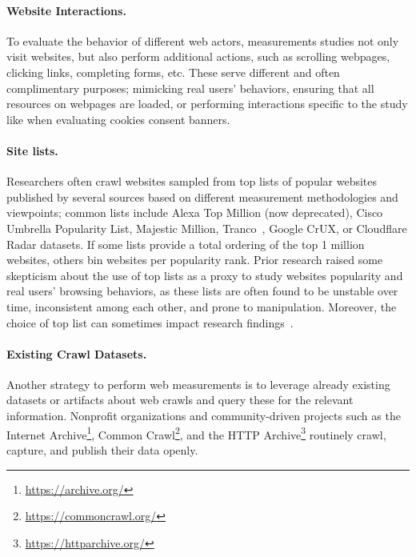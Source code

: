 \paragraph{Website Interactions.}
To evaluate the behavior of different web actors, measurements studies not only visit websites, but also perform additional actions, such as scrolling webpages, clicking links, completing forms, etc. These serve different and often complimentary purposes; mimicking real users' behaviors, ensuring that all resources on webpages are loaded, or performing interactions specific to the study like when evaluating cookies consent banners.

\paragraph{Site lists.}
Researchers often crawl websites sampled from top lists of popular websites published by several sources based on different measurement methodologies and viewpoints; common lists include Alexa Top Million (now deprecated), Cisco Umbrella Popularity List, Majestic Million, Tranco~\cite{lepochatTrancoResearchOrientedTop2019}, Google CrUX, or Cloudflare Radar datasets. If some lists provide a total ordering of the top 1 million websites, others bin websites per popularity rank. Prior research raised some skepticism about the use of top lists as a proxy to study websites popularity and real users' browsing behaviors, as these lists are often found to be unstable over time, inconsistent among each other, and prone to manipulation. Moreover, the choice of top list can sometimes impact research findings~\cite{lepochatTrancoResearchOrientedTop2019,ruthTopplingTopLists2022}.

\paragraph{Existing Crawl Datasets.}
Another strategy to perform web measurements is to leverage already existing datasets or artifacts about web crawls and query these for the relevant information. Nonprofit organizations and community-driven projects such as the Internet Archive\footnote{\url{https://archive.org/}}, Common Crawl\footnote{\url{https://commoncrawl.org/}}, and the HTTP Archive\footnote{\url{https://httparchive.org/}} routinely crawl, capture, and publish their data openly.

